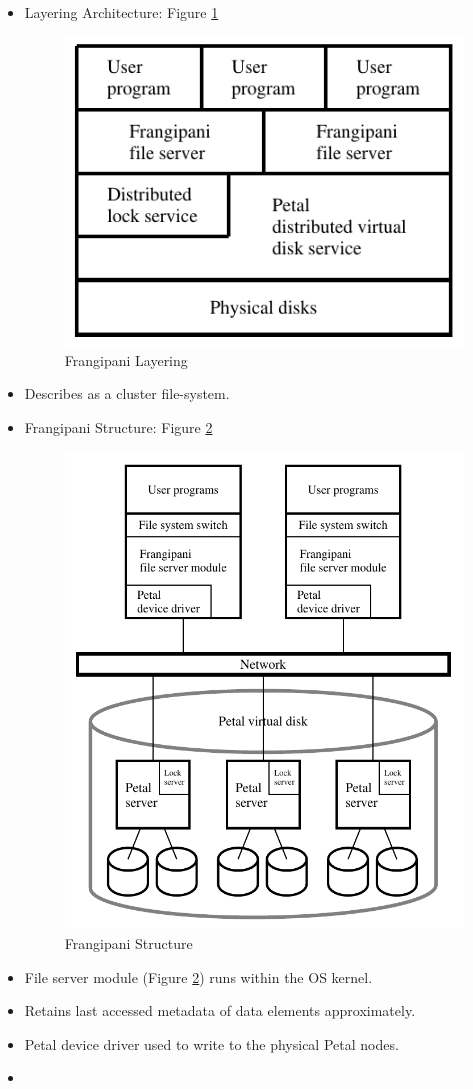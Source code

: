 \documentclass[parskip=half]{scrartcl}
\begin{document}
        \begin{itemize}
            \item 
            Layering Architecture: Figure \ref{fig:frangipani-layering}
            \begin{figure}[ht]
                \centering
                \includegraphics[width=.4\textwidth]{frangipani-layering}
                \caption{Frangipani Layering}
                \label{fig:frangipani-layering}
            \end{figure}
            \item 
            Describes as a cluster file-system.
            \item 
            Frangipani Structure: Figure \ref{fig:frangipani-structure}
            \begin{figure}[ht]
                \centering
                \includegraphics[width=.4\textwidth]{frangipani-structure}
                \caption{Frangipani Structure}
                \label{fig:frangipani-structure}
            \end{figure}
            \item 
            File server module (Figure \ref{fig:frangipani-structure}) runs within the OS kernel.
            \item 
            Retains last accessed metadata of data elements approximately.
            \item 
            Petal device driver used to write to the physical Petal nodes.
            \item 

\end{itemize}
\end{document}
